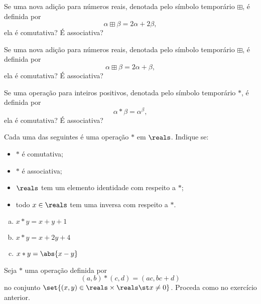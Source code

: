 \begin{exercise}
	Se uma nova adição para números reais, denotada pelo símbolo temporário $\boxplus$, é definida por
	$$
		\alpha \boxplus \beta = 2\alpha + 2\beta,
	$$
	ela é comutativa? É associativa?
\end{exercise}

\begin{exercise}
	Se uma nova adição para números reais, denotada pelo símbolo temporário $\boxplus$, é definida por
	$$
		\alpha \boxplus \beta = 2\alpha + \beta,
	$$
	ela é comutativa? É associativa?
\end{exercise}

\begin{exercise}
	Se uma operação para inteiros positivos, denotada pelo símbolo temporário $*$, é definida por
	$$
		\alpha * \beta = \alpha^{\beta},
	$$
	ela é comutativa? É associativa?
\end{exercise}

\begin{exercise}
    Cada uma das seguintes é uma operação $*$ em $\reals$. Indique se:
    \begin{itemize}
        \item $*$ é comutativa;
        \item $*$ é associativa;
        \item $\reals$ tem um elemento identidade com respeito a $*$;
        \item todo $x \in \reals$ tem uma inversa com respeito a $*$.
    \end{itemize}

    \begin{enumerate}[(a)]
        \item $x * y = x + y + 1$
        \item $x * y = x + 2y + 4$
        \item $x * y = \abs{x - y}$
    \end{enumerate}
\end{exercise}

\begin{exercise}
    Seja $*$ uma operação definida por
    $$
        (a,b) * (c,d) = (ac, bc + d)
    $$
    no conjunto $\set{(x,y) \in \reals \times \reals \st x \not = 0}$. Proceda como no exercício anterior.
\end{exercise}
